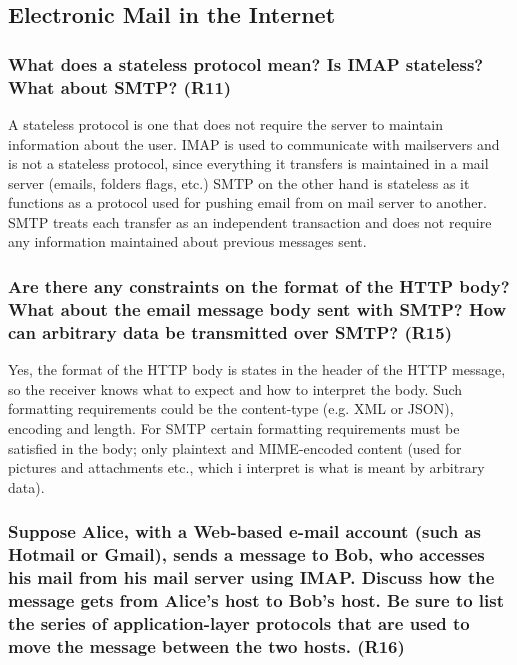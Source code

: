 \subsection{Electronic Mail in the Internet}

\subsubsection{What does a stateless protocol mean? Is IMAP stateless? What about SMTP? (R11)}

A stateless protocol is one that does not require the server to maintain information about the user. IMAP is used to communicate with mailservers and is not a stateless protocol, since everything it transfers is maintained in a mail server (emails, folders flags, etc.) SMTP on the other hand is stateless as it functions as a protocol used for pushing email from on mail server to another. SMTP treats each transfer as an independent transaction and does not require any information maintained about previous messages sent.



\subsubsection{Are there any constraints on the format of the HTTP body? What about the email message body sent with SMTP? How can arbitrary data be transmitted over SMTP? (R15)}

Yes, the format of the HTTP body is states in the header of the HTTP message, so the receiver knows what to expect and how to interpret the body. Such formatting requirements could be the content-type (e.g. XML or JSON), encoding and length. For SMTP certain formatting requirements must be satisfied in the body; only plaintext and MIME-encoded content (used for pictures and attachments etc., which i interpret is what is meant by arbitrary data).



\subsubsection{Suppose Alice, with a Web-based e-mail account (such as Hotmail or Gmail), sends a message to Bob, who accesses his mail from his mail server using IMAP. Discuss how the message gets from Alice's host to Bob's host. Be sure to list the series of application-layer protocols that are used to move the message between the two hosts. (R16)}

